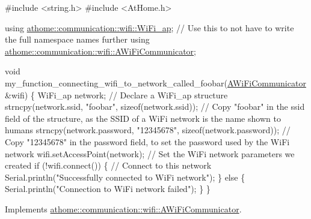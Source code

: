 \begin{DoxyCode}
\textcolor{preprocessor}{#include <string.h>}
\textcolor{preprocessor}{#include <AtHome.h>}

\textcolor{keyword}{using} \mbox{\hyperlink{structathome_1_1communication_1_1wifi_1_1s__wifi__access__point}{athome::communication::wifi::WiFi\_ap}}; \textcolor{comment}{// Use this to not have to
       write the full namespace names further}
\textcolor{keyword}{using} \mbox{\hyperlink{classathome_1_1communication_1_1wifi_1_1_a_wi_fi_communicator}{athome::communication::wifi::AWiFiCommunicator}};

\textcolor{keywordtype}{void} my\_function\_connecting\_wifi\_to\_network\_called\_foobar(\mbox{\hyperlink{classathome_1_1communication_1_1wifi_1_1_a_wi_fi_communicator_a0098148fe8d0eeee99b7f8f72a72a900}{AWiFiCommunicator}} &wifi) \{
  WiFi\_ap network; \textcolor{comment}{// Declare a WiFi\_ap structure}
  strncpy(network.ssid, \textcolor{stringliteral}{"foobar"}, \textcolor{keyword}{sizeof}(network.ssid)); \textcolor{comment}{// Copy "foobar" in the ssid field of the
       structure, as the SSID of a WiFi network is the name shown to humans}
  strncpy(network.password, \textcolor{stringliteral}{"12345678"}, \textcolor{keyword}{sizeof}(network.password)); \textcolor{comment}{// Copy "12345678" in the password
       field, to set the password used by the WiFi network}
  wifi.setAccessPoint(network); \textcolor{comment}{// Set the WiFi network parameters we created}
  \textcolor{keywordflow}{if} (!wifi.connect()) \{ \textcolor{comment}{// Connect to this network}
    Serial.println(\textcolor{stringliteral}{"Successfully connected to WiFi network"});
  \} \textcolor{keywordflow}{else} \{
    Serial.println(\textcolor{stringliteral}{"Connection to WiFi network failed"});
  \}
\}
\end{DoxyCode}
 

Implements \mbox{\hyperlink{classathome_1_1communication_1_1wifi_1_1_a_wi_fi_communicator_a309927109fbc19aa0fb2afb71d50bbf9}{athome\+::communication\+::wifi\+::\+A\+Wi\+Fi\+Communicator}}.

\mbox{\label{classathome_1_1communication_1_1wifi_1_1_e_s_p8266_wi_fi_communicator_a159a93b350df135daa967665c9e53e2f}} 
